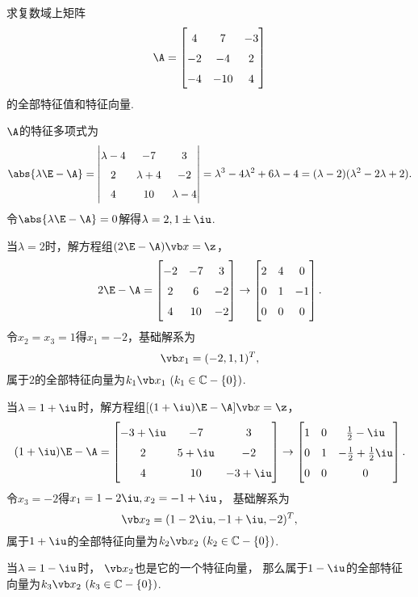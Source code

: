 \begin{example}
求复数域上矩阵\[
	\A = \begin{bmatrix}
		4 & 7 & -3 \\
		-2 & -4 & 2 \\
		-4 & -10 & 4
	\end{bmatrix}
\]的全部特征值和特征向量.
\begin{solution}
\(\A\)的特征多项式为\[
	\abs{\lambda\E-\A}
	= \begin{vmatrix}
		\lambda-4 & -7 & 3 \\
		2 & \lambda+4 & -2 \\
		4 & 10 & \lambda-4
	\end{vmatrix}
	= \lambda^3 - 4\lambda^2 + 6\lambda - 4
	= (\lambda-2)(\lambda^2-2\lambda+2).
\]
令\(\abs{\lambda\E-\A}=0\)解得\(\lambda=2,1\pm\iu\).

当\(\lambda=2\)时，解方程组\((2\E-\A)\x=\z\)，\[
	2\E-\A = \begin{bmatrix}
		-2 & -7 & 3 \\
		2 & 6 & -2 \\
		4 & 10 & -2
	\end{bmatrix} \to \begin{bmatrix}
		2 & 4 & 0 \\
		0 & 1 & -1 \\
		0 & 0 & 0
	\end{bmatrix}.
\]
令\(x_2=x_3=1\)得\(x_1=-2\)，基础解系为\[
	\x_1 = (-2,1,1)^T,
\]
属于\(2\)的全部特征向量为\(k_1\x_1\ (k_1\in\mathbb{C}-\{0\})\).

当\(\lambda=1+\iu\)时，解方程组\([(1+\iu)\E-\A]\x=\z\)，\[
	(1+\iu)\E-\A = \begin{bmatrix}
		-3+\iu & -7 & 3 \\
		2 & 5+\iu & -2 \\
		4 & 10 & -3+\iu
	\end{bmatrix}
	\to \def\arraystretch{1.5}\begin{bmatrix}
		1 & 0 & \frac{1}{2}-\iu \\
		0 & 1 & -\frac{1}{2}+\frac{1}{2}\iu \\
		0 & 0 & 0
	\end{bmatrix}.
\]
令\(x_3=-2\)得\(x_1=1-2\iu,x_2=-1+\iu\)，
基础解系为\[
	\x_2 = (1-2\iu,-1+\iu,-2)^T,
\]
属于\(1+\iu\)的全部特征向量为\(k_2\x_2\ (k_2\in\mathbb{C}-\{0\})\).

当\(\lambda=1-\iu\)时，
\(\x_2\)也是它的一个特征向量，
那么属于\(1-\iu\)的全部特征向量为\(k_3\x_2\ (k_3\in\mathbb{C}-\{0\})\).
\end{solution}
\end{example}
